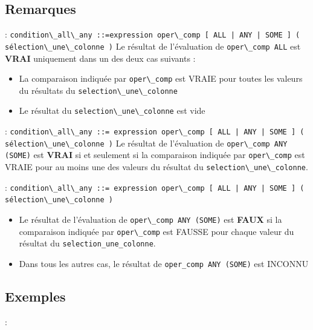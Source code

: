 \documentclass[10pt]{beamer}
\begin{document}
\subsection{Remarques}
\begin{frame}{\secname : \subsecname}
    \lstinline[language=bnf]!condition\_all\_any ::=expression oper\_comp [ ALL | ANY | SOME ] ( sélection\_une\_colonne )!
    Le résultat de l'évaluation de \lstinline[language=bnf]!oper\_comp ALL! est \textbf{VRAI} uniquement dans un des deux cas suivants :
    \begin{itemize}
        \item La comparaison indiquée par \lstinline[language=bnf]!oper\_comp! est VRAIE pour toutes les valeurs du résultats du \lstinline[language=bnf]!selection\_une\_colonne!
        \item Le résultat du \lstinline[language=bnf]!selection\_une\_colonne! est vide
    \end{itemize}
\end{frame}

\begin{frame}{\secname : \subsecname}
    \lstinline[language=bnf]!condition\_all\_any ::= expression oper\_comp [ ALL | ANY | SOME ] ( sélection\_une\_colonne )!
    Le résultat de l'évaluation de \lstinline[language=bnf]!oper\_comp ANY (SOME)! est \textbf{VRAI} si et seulement si la comparaison indiquée par \lstinline[language=bnf]!oper\_comp! est VRAIE pour au moins une des valeurs du résultat du \lstinline[language=bnf]!selection\_une\_colonne!.
\end{frame}

\begin{frame}{\secname : \subsecname}
    \lstinline[language=bnf]!condition\_all\_any ::= expression oper\_comp [ ALL | ANY | SOME ] ( sélection\_une\_colonne )!
    \begin{itemize}
        \item  Le résultat de l'évaluation de \lstinline[language=bnf]!oper\_comp ANY (SOME)! est \textbf{FAUX} si la comparaison indiquée par \lstinline[language=bnf]!oper\_comp! est FAUSSE pour chaque valeur du résultat du \lstinline[language=bnf]!selection_une_colonne!.
        \item Dans tous les autres cas, le résultat de \lstinline[language=bnf]!oper_comp ANY (SOME)! est INCONNU
    \end{itemize}
\end{frame}

\subsection{Exemples}
\begin{frame}{\secname : \subsecname}
    
\end{frame}
\end{document}
